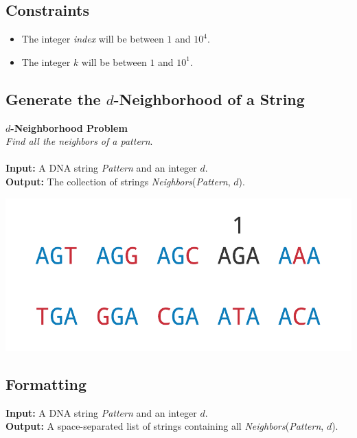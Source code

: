 \documentclass{article}
\begin{document}
\subsection*{Constraints}
\begin{itemize}
    \item The integer \emph{index} will be between $1$ and $10^4$.
    \item The integer $k$ will be between $1$ and $10^1$.
\end{itemize}
\pagebreak
\subsection{Generate the $d$-Neighborhood of a String}
\hline\vspace{5}
\noindent \textbf{$d$-Neighborhood Problem}\\
\emph{Find all the neighbors of a pattern}.\\ \\
\textbf{Input:} A DNA string \emph{Pattern} and an integer $d$.\\
\textbf{Output:} The collection of strings \emph{Neighbors}(\emph{Pattern}, $d$).
\begin{center}
    \includegraphics[scale=0.2]{c1/logos/1N.png} 
\end{center}
\hline\vspace{5}

\subsection*{Formatting}
\textbf{Input:} A DNA string \emph{Pattern} and an integer $d$.\\
\noindent \textbf{Output:} A space-separated list of strings containing all \emph{Neighbors}(\emph{Pattern}, $d$).
\end{document}
